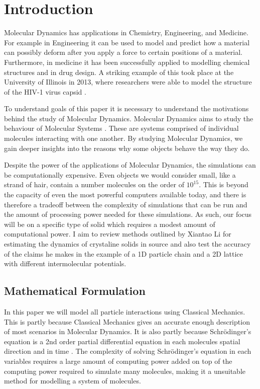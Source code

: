 \section{Introduction}


Molecular Dynamics has applications in Chemistry, Engineering, and Medicine. For example in Engineering it can be used to model and predict how a material can possibly deform after you apply a force to certain positions of a material. Furthermore, in medicine it has been successfully applied to modelling chemical structures and in drug design. A striking example of this took place at the University of Illinois in 2013, where researchers were able to model the structure of the HIV-1 virus capsid   \citep{Zhao2013}.

To understand goals of this paper it is necessary to understand the motivations behind the study of Molecular Dynamics. Molecular Dynamics aims to study the behaviour of Molecular Systems \citep{BenLeimkuhler2015}
. These are systems comprised of individual molecules interacting with one another. By studying Molecular Dynamics, we gain deeper insights into the reasons why some objects behave the way they do. 

Despite the power of the applications of Molecular Dynamics, the simulations can be
computationally expensive. Even objects we would consider small, like a strand of hair, contain a number molecules on the order of
 $10^{15}$.  This is beyond the capacity of even the most powerful computers available today, and there is therefore a tradeoff between the complexity of simulations that can be run and the amount of processing power needed for these simulations. As such, our focus will be on a specific type of solid which requires a modest amount of computational power. I aim to review methods outlined by Xiantao Li for estimating the dynamics of crystaline solids in source \cite{Li2010} and also test the accuracy of the  claims he makes in the example of a 1D particle chain and a 2D lattice with different intermolecular potentials.




\subsection{Mathematical Formulation}

In this paper we will model all particle interactions using Classical Mechanics. This is partly because Classical Mechanics gives an accurate enough description of most scenarios in Molecular Dynamics. It is also partly because   Schr\"{o}dinger's equation is a 2nd order partial differential equation in each molecules spatial direction and in time \citep{BenLeimkuhler2015}.  The complexity of solving Schr\"{o}dinger's equation in each variables requires a large amount of computing power added on top of the computing power required to simulate many molecules, making it a unsuitable method for modelling a system of molecules.

